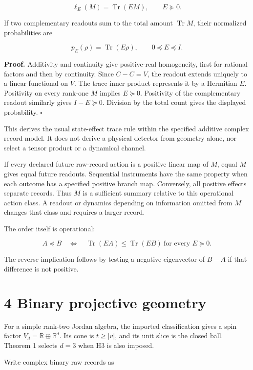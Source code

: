 \documentclass[
  11pt,
  a4paper,
]{article}
\begin{document}
\[\ell_E(M)=\operatorname{Tr}(EM),\qquad E\succeq0.\]

If two complementary readouts sum to the total amount \(\operatorname{Tr}M\), their normalized probabilities are

\[p_E(\rho)=\operatorname{Tr}(E\rho),\qquad 0\preceq E\preceq I.\]

\textbf{Proof.} Additivity and continuity give positive-real homogeneity, first for rational factors and then by continuity. Since \(C-C=V\), the readout extends uniquely to a linear functional on \(V\). The trace inner product represents it by a Hermitian \(E\). Positivity on every rank-one \(M\) implies \(E\succeq0\). Positivity of the complementary readout similarly gives \(I-E\succeq0\). Division by the total count gives the displayed probability. \(\square\)

This derives the usual state-effect trace rule within the specified additive complex record model. It does not derive a physical detector from geometry alone, nor select a tensor product or a dynamical channel.

If every declared future raw-record action is a positive linear map of \(M\), equal \(M\) gives equal future readouts. Sequential instruments have the same property when each outcome has a specified positive branch map. Conversely, all positive effects separate records. Thus \(M\) is a sufficient summary relative to this operational action class. A readout or dynamics depending on information omitted from \(M\) changes that class and requires a larger record.

The order itself is operational:

\[A\preceq B
\quad\Longleftrightarrow\quad
\operatorname{Tr}(EA)\le\operatorname{Tr}(EB)
\ \text{for every }E\succeq0.\]

The reverse implication follows by testing a negative eigenvector of \(B-A\) if that difference is not positive.

\section{4 Binary projective geometry}\label{binary-projective-geometry}

For a simple rank-two Jordan algebra, the imported classification gives a spin factor \(V_d=\mathbb R\oplus\mathbb R^d\). Its cone is \(t\ge|v|\), and its unit slice is the closed ball. Theorem 1 selects \(d=3\) when H3 is also imposed.

Write complex binary raw records as
\end{document}
